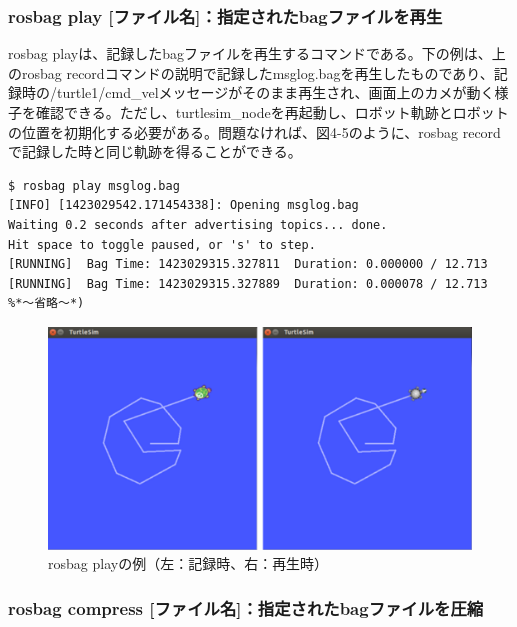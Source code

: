 \subsubsection{rosbag play [ファイル名]：指定されたbagファイルを再生}

rosbag playは、記録したbagファイルを再生するコマンドである。下の例は、上のrosbag recordコマンドの説明で記録したmsglog.bagを再生したものであり、記録時の/turtle1/cmd\_velメッセージがそのまま再生され、画面上のカメが動く様子を確認できる。ただし、turtlesim\_nodeを再起動し、ロボット軌跡とロボットの位置を初期化する必要がある。問題なければ、図4-5のように、rosbag recordで記録した時と同じ軌跡を得ることができる。

\begin{lstlisting}[language=ROS]
$ rosbag play msglog.bag
[INFO] [1423029542.171454338]: Opening msglog.bag
Waiting 0.2 seconds after advertising topics... done.
Hit space to toggle paused, or 's' to step.
[RUNNING]  Bag Time: 1423029315.327811  Duration: 0.000000 / 12.713
[RUNNING]  Bag Time: 1423029315.327889  Duration: 0.000078 / 12.713
%*〜省略〜*)
\end{lstlisting}

\begin{figure}[h]
  \centering
  \includegraphics[width=15cm]{pictures/chapter4/pic_04_05.png}
  \caption{rosbag playの例（左：記録時、右：再生時）}
\end{figure}

\subsubsection{rosbag compress [ファイル名]：指定されたbagファイルを圧縮}

